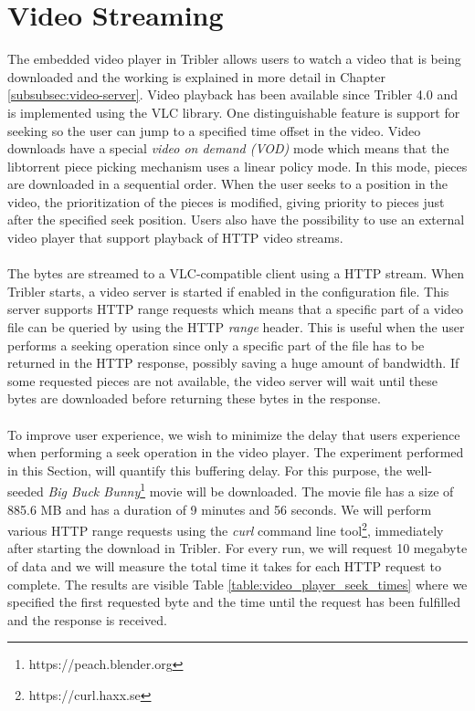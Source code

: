 \section{Video Streaming}
The embedded video player in Tribler allows users to watch a video that is being downloaded and the working is explained in more detail in Chapter \ref{subsubsec:video-server}. Video playback has been available since Tribler 4.0 and is implemented using the VLC library. One distinguishable feature is support for seeking so the user can jump to a specified time offset in the video. Video downloads have a special \emph{video on demand (VOD)} mode which means that the libtorrent piece picking mechanism uses a linear policy mode. In this mode, pieces are downloaded in a sequential order. When the user seeks to a position in the video, the prioritization of the pieces is modified, giving priority to pieces just after the specified seek position. Users also have the possibility to use an external video player that support playback of HTTP video streams.\\\\
The bytes are streamed to a VLC-compatible client using a HTTP stream. When Tribler starts, a video server is started if enabled in the configuration file. This server supports HTTP range requests which means that a specific part of a video file can be queried by using the HTTP \emph{range} header. This is useful when the user performs a seeking operation since only a specific part of the file has to be returned in the HTTP response, possibly saving a huge amount of bandwidth. If some requested pieces are not available, the video server will wait until these bytes are downloaded before returning these bytes in the response.\\\\
To improve user experience, we wish to minimize the delay that users experience when performing a seek operation in the video player. The experiment performed in this Section, will quantify this buffering delay. For this purpose, the well-seeded \emph{Big Buck Bunny}\footnote{https://peach.blender.org} movie will be downloaded. The movie file has a size of 885.6 MB and has a duration of 9 minutes and 56 seconds. We will perform various HTTP range requests using the \emph{curl} command line tool\footnote{https://curl.haxx.se}, immediately after starting the download in Tribler. For every run, we will request 10 megabyte of data and we will measure the total time it takes for each HTTP request to complete. The results are visible Table \ref{table:video_player_seek_times} where we specified the first requested byte and the time until the request has been fulfilled and the response is received.\\


